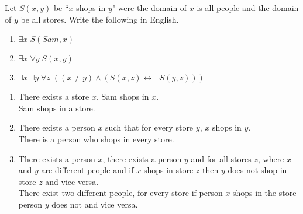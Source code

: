 \documentclass[12pt,addpoints]{exam}
\newcommand{\lra}{\leftrightarrow}
\begin{document}
\begin{questions}
\question[6] Let $S(x,y)$ be ``$x$ shops in $y$" were the domain of $x$ is all people and the domain of $y$ be all stores.  Write the following in English.
\begin{enumerate}[label=(\alph*),itemsep=0pt,parsep=0pt,topsep=0pt,partopsep=0pt]
    \item $\exists x\; S(Sam, x)$
    \item $\exists x\; \forall y\; S(x,y)$
    \item $\exists x\; \exists y\; \forall z\; ((x \neq y) \wedge (S(x,z) \lra \neg S(y,z)))$
\end{enumerate}
    \ifprintanswers
        \vspace{-10pt}
    \fi
\begin{solution}
    \begin{enumerate}[label=(\alph*),itemsep=0pt,parsep=0pt,topsep=0pt,partopsep=0pt]
        \item There exists a store $x$, Sam shops in $x$.  \\
        Sam shops in a store.
        \item There exists a person $x$ such that for every store $y$, $x$ shops in $y$. \\
            There is a person who shops in every store.
        \item There exists a person $x$, there exists a person $y$ and for all stores $z$, where $x$ and $y$ are different people and if $x$ shops in store $z$ then $y$ does not shop in store $z$ and vice versa. \\
            There exist two different people, for every store if person $x$ shops in the store person $y$ does not and vice versa.
    \end{enumerate}
\end{solution}



\end{questions}
\end{document}
